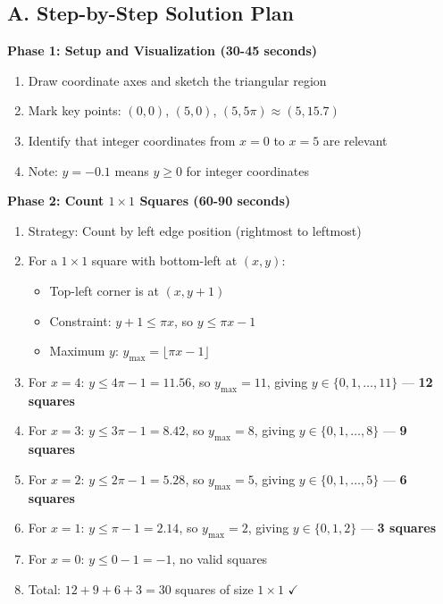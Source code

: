 \documentclass[12pt]{article}
\begin{document}
\begin{roadmapbox}
\subsection*{A. Step-by-Step Solution Plan}

\textbf{Phase 1: Setup and Visualization (30-45 seconds)}
\begin{enumerate}
    \item Draw coordinate axes and sketch the triangular region
    \item Mark key points: $(0,0)$, $(5, 0)$, $(5, 5\pi) \approx (5, 15.7)$
    \item Identify that integer coordinates from $x = 0$ to $x = 5$ are relevant
    \item Note: $y = -0.1$ means $y \geq 0$ for integer coordinates
\end{enumerate}

\textbf{Phase 2: Count $1 \times 1$ Squares (60-90 seconds)}
\begin{enumerate}[resume]
    \item Strategy: Count by left edge position (rightmost to leftmost)
    \item For a $1 \times 1$ square with bottom-left at $(x, y)$:
    \begin{itemize}
        \item Top-left corner is at $(x, y+1)$
        \item Constraint: $y+1 \leq \pi x$, so $y \leq \pi x - 1$
        \item Maximum $y$: $y_{\max} = \lfloor \pi x - 1 \rfloor$
    \end{itemize}
    \item For $x=4$: $y \leq 4\pi - 1 = 11.56$, so $y_{\max} = 11$, giving $y \in \{0, 1, \ldots, 11\}$ — \textbf{12 squares}
    \item For $x=3$: $y \leq 3\pi - 1 = 8.42$, so $y_{\max} = 8$, giving $y \in \{0, 1, \ldots, 8\}$ — \textbf{9 squares}
    \item For $x=2$: $y \leq 2\pi - 1 = 5.28$, so $y_{\max} = 5$, giving $y \in \{0, 1, \ldots, 5\}$ — \textbf{6 squares}
    \item For $x=1$: $y \leq \pi - 1 = 2.14$, so $y_{\max} = 2$, giving $y \in \{0, 1, 2\}$ — \textbf{3 squares}
    \item For $x=0$: $y \leq 0 - 1 = -1$, no valid squares
    \item Total: $12 + 9 + 6 + 3 = \boxed{30}$ squares of size $1 \times 1$ $\checkmark$
\end{enumerate}


\end{roadmapbox}
\end{document}
